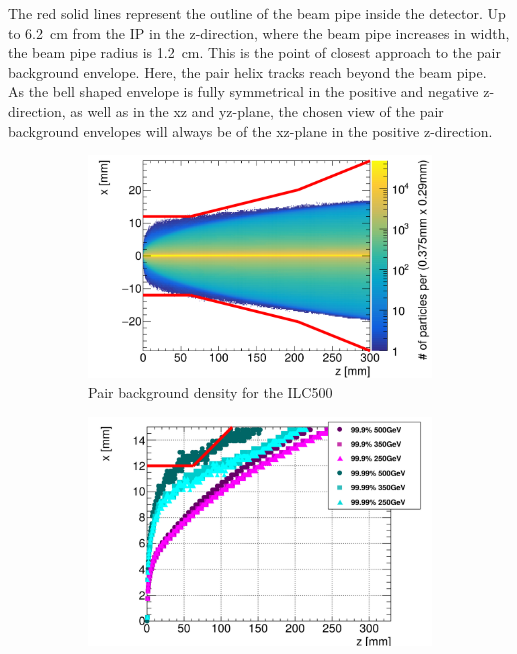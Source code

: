 The red solid lines represent the outline of the beam pipe inside the \sid detector.
Up to \SI{6.2}{\centi\meter} from the IP in the z-direction, where the beam pipe increases in width, the beam pipe radius is \SI{1.2}{\centi\meter}. 
This is the point of closest approach to the pair background envelope.
Here, the pair helix tracks reach beyond the beam pipe.
\\As the bell shaped envelope is fully symmetrical in the positive and negative z-direction, as well as in the xz and yz-plane, the chosen view of the pair background envelopes will always be of the xz-plane in the positive z-direction.
 \begin{figure}
 \centering
  \begin{subfigure}[b]{0.49\textwidth}
   \centering
    \includegraphics[width=\textwidth]{Figures/Pairs/Helix_tracks_xz_80bunches_500GeV_5T.png}
   \caption{Pair background density for the ILC500}
   \end{subfigure}
   \hfill
    \begin{subfigure}[b]{0.49\textwidth}
   \centering
    \includegraphics[width=\textwidth]{Figures/Pairs/HelixEnvelopes_COMPARISON_xz_500_350_250_comparison_EDITED_2.png}

\end{subfigure}
\end{figure}
